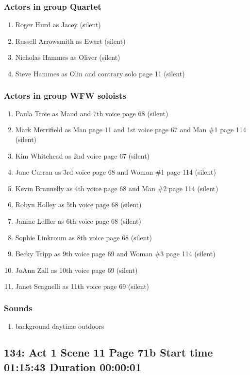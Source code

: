 \subsubsection{Actors in group Quartet}
\begin{enumerate}
\item Roger Hurd as Jacey (silent)
\item Russell Arrowsmith as Ewart (silent)
\item Nicholas Hammes as Oliver (silent)
\item Steve Hammes as Olin and contrary solo page 11 (silent)
\end{enumerate}
\subsubsection{Actors in group WFW soloists}
\begin{enumerate}
\item Paula Troie as Maud and 7th voice page 68 (silent)
\item Mark Merrifield as Man page 11 and 1st voice page 67 and Man \#1 page 114 (silent)
\item Kim Whitehead as 2nd voice page 67 (silent)
\item Jane Curran as 3rd voice page 68 and Woman \#1 page 114 (silent)
\item Kevin Brannelly as 4th voice page 68 and Man \#2 page 114 (silent)
\item Robyn Holley as 5th voice page 68 (silent)
\item Janine Leffler as 6th voice page 68 (silent)
\item Sophie Linkroum as 8th voice page 68 (silent)
\item Becky Tripp as 9th voice page 69 and Woman \#3 page 114 (silent)
\item JoAnn Zall as 10th voice page 69 (silent)
\item Janet Scagnelli as 11th voice page 69 (silent)
\end{enumerate}

\subsubsection{Sounds}
\begin{enumerate}
\item background daytime outdoors
\end{enumerate}
\subsection{134: Act 1 Scene 11 Page 71b Start time 01:15:43 Duration 00:00:01}
